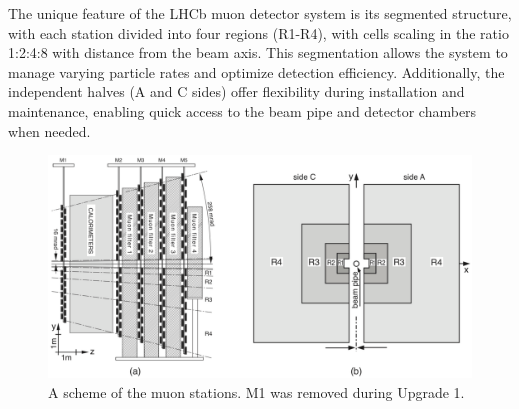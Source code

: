 The unique feature of the LHCb muon detector system is its segmented structure, with each station divided into four regions (R1-R4), with cells scaling in the ratio 1:2:4:8 with distance from the beam axis. This segmentation allows the system to manage varying particle rates and optimize detection efficiency. Additionally, the independent halves (A and C sides) offer flexibility during installation and maintenance, enabling quick access to the beam pipe and detector chambers when needed.
\begin{figure}
    \centering
    \includegraphics[width=\textwidth]{figures/muon.png}
    \caption{A scheme of the muon stations. M1 was removed during Upgrade 1.}
    \label{fig:muon}
\end{figure}


